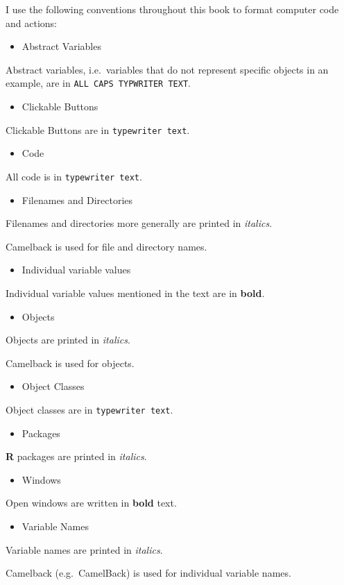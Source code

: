 I use the following conventions throughout this book to format computer
code and actions:

\begin{itemize}
\item
  Abstract Variables
\end{itemize}
Abstract variables, i.e.~variables that do not represent specific
objects in an example, are in \texttt{ALL CAPS TYPWRITER TEXT}.

\begin{itemize}
\item
  Clickable Buttons
\end{itemize}
Clickable Buttons are in \texttt{typewriter text}.

\begin{itemize}
\item
  Code
\end{itemize}
All code is in \texttt{typewriter text}.

\begin{itemize}
\item
  Filenames and Directories
\end{itemize}
Filenames and directories more generally are printed in \emph{italics}.

Camelback is used for file and directory names.

\begin{itemize}
\item
  Individual variable values
\end{itemize}
Individual variable values mentioned in the text are in \textbf{bold}.

\begin{itemize}
\item
  Objects
\end{itemize}
Objects are printed in \emph{italics}.

Camelback is used for objects.

\begin{itemize}
\item
  Object Classes
\end{itemize}
Object classes are in \texttt{typewriter text}.

\begin{itemize}
\item
  Packages
\end{itemize}
\textbf{R} packages are printed in \emph{italics}.

\begin{itemize}
\item
  Windows
\end{itemize}
Open windows are written in \textbf{bold} text.

\begin{itemize}
\item
  Variable Names
\end{itemize}
Variable names are printed in \emph{italics}.

Camelback (e.g.~CamelBack) is used for individual variable names.
